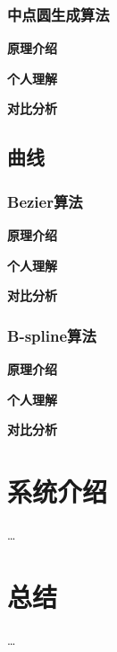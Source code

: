 \documentclass[a4paper,UTF8]{article}
\theoremstyle{definition}
\begin{document}
\subsubsection{中点圆生成算法}
\textbf{原理介绍}\par

\textbf{个人理解}\par

\textbf{对比分析}\par
\subsection{曲线}
\subsubsection{Bezier算法}
\textbf{原理介绍}\par

\textbf{个人理解}\par

\textbf{对比分析}\par
\subsubsection{B-spline算法}
\textbf{原理介绍}\par

\textbf{个人理解}\par

\textbf{对比分析}\par
\section{系统介绍}
\dots

\section{总结}
\dots

%



\end{document}
